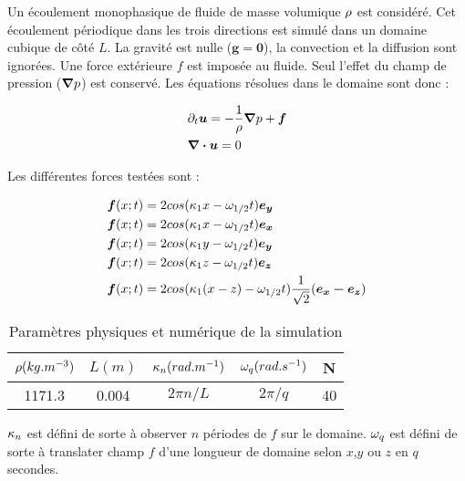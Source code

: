 Un écoulement monophasique de fluide de masse volumique $\r$ est considéré. Cet écoulement périodique dans les trois directions est simulé dans un domaine cubique de côté $L$. La gravité est nulle ($\bm{g} =  \bm{0}$), la convection et la diffusion sont ignorées. Une force extérieure $f$ est imposée au fluide. Seul l'effet du champ de pression ($\bm{\na} p$) est conservé. Les équations résolues dans le domaine sont donc : 

\begin{align}
&\p_t \bm{u} = - \frac{1}{\r} \bm{\nabla} p + \bm{f} \\                
&\bm{ \nabla \cdot u } = 0 \\
\end{align}

Les différentes forces testées sont : 

\begin{align}
&\bm{f}(x;t)  = 2 cos(\k_1 x - \o_{1/2} t) \bm{e_y} \\
&\bm{f}(x;t)  = 2 cos(\k_1 x - \o_{1/2} t) \bm{e_x} \\
&\bm{f}(x;t)  = 2 cos(\k_1 y - \o_{1/2} t) \bm{e_y} \\
&\bm{f}(x;t)  = 2 cos(\k_1 z - \o_{1/2} t) \bm{e_z} \\
&\bm{f}(x;t)  = 2 cos(\k_1 (x-z) - \o_{1/2} t) \frac{1}{\sqrt{2}}(\bm{e_x - e_z}) \\
\end{align}

\begin{table}[h]
\begin{center}
\begin{tabular}{c|c|c|c|c}
$\r(kg.m^{-3})$ & $ L(m)$ &  $\k_n(rad.m^{-1})$        & $\o_q(rad.s^{-1})$ & N \\ \hline
1171.3          & 0.004   &  $2 \pi n / L$             & $2 \pi / q $       & 40
\end{tabular}
\end{center}
\caption{Paramètres physiques et numérique de la simulation}
\end{table}

$\k_n$ est défini de sorte à observer $n$ périodes de $f$ sur le domaine.
$\o_q$ est défini de sorte à translater champ $f$ d'une longueur de domaine selon $x$,$y$ ou $z$ en $q$ secondes.